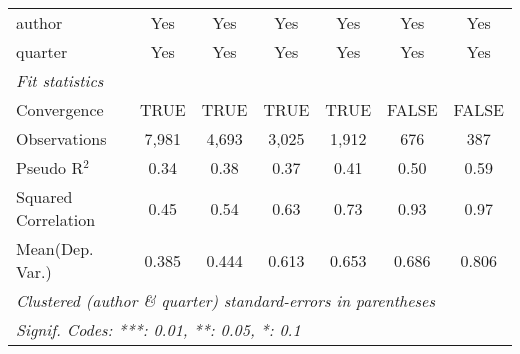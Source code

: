 \begin{tabular}{lcccccc}
   author                                                     & Yes           & Yes           & Yes          & Yes           & Yes           & Yes\\  
   quarter                                                    & Yes           & Yes           & Yes          & Yes           & Yes           & Yes\\  
   \midrule
   \emph{Fit statistics}\\
   Convergence                                                &TRUE           & TRUE          & TRUE         & TRUE          & FALSE         & FALSE\\  
   Observations                                               & 7,981         & 4,693         & 3,025        & 1,912         & 676           & 387\\  
   Pseudo R$^2$                                               & 0.34          & 0.38          & 0.37         & 0.41          & 0.50          & 0.59\\  
   Squared Correlation                                        & 0.45          & 0.54          & 0.63         & 0.73          & 0.93          & 0.97\\  
Mean(Dep. Var.) & 0.385 & 0.444 & 0.613 & 0.653 & 0.686 & 0.806 \\
   \midrule \midrule
   \multicolumn{7}{l}{\emph{Clustered (author \& quarter) standard-errors in parentheses}}\\
   \multicolumn{7}{l}{\emph{Signif. Codes: ***: 0.01, **: 0.05, *: 0.1}}\\
\end{tabular}
\par\endgroup
